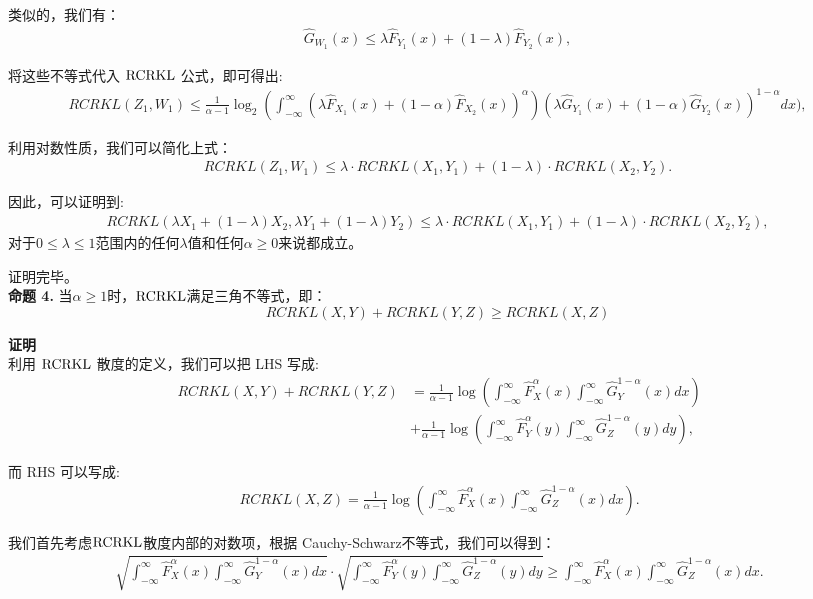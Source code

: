 类似的，我们有：
\begin{align*}
\hat G_{W_{1}}(x) \leq \lambda \hat F_{Y_{1}}(x)+ (1-\lambda) \hat F_{Y_{2}}(x),
\end{align*}

将这些不等式代入 $\rm{RCRKL}$ 公式，即可得出:
\begin{align*}
RCRKL(Z_{1},W_{1})\leq \frac{1}{\alpha -1}\log_{2}(\int_{-\infty}^{\infty}(\lambda \hat F_{X_{1}}(x)+(1-\alpha)\hat F_{X_{2}}(x))^{\alpha})(\lambda \hat G_{Y_{1}}(x)+(1-\alpha)\hat G_{Y_{2}}(x))^{1-\alpha}dx),
\end{align*}

利用对数性质，我们可以简化上式：
\begin{align*}
RCRKL(Z_{1},W_{1})\leq \lambda \cdot RCRKL(X_{1},Y_{1}) +(1-\lambda) \cdot RCRKL(X_{2},Y_{2}).
\end{align*}

因此，可以证明到:
\begin{align*}
RCRKL(\lambda X_{1}+(1-\lambda)X_{2}, \lambda Y_{1}+(1-\lambda)Y_{2})\leq \lambda \cdot RCRKL(X_{1},Y_{1}) +(1-\lambda) \cdot RCRKL(X_{2},Y_{2}),
\end{align*}
对于$0\leq \lambda \leq 1$范围内的任何$\lambda$值和任何$\alpha \geq 0$来说都成立。

证明完毕。\\

\textbf{命题 4.} 当$\alpha \ge 1$时，$\rm{RCRKL}$满足三角不等式，即：
$$RCRKL(X,Y) + RCRKL(Y,Z) \ge RCRKL(X,Z)$$

\textbf{证明}\\
利用 $\rm{RCRKL}$ 散度的定义，我们可以把 LHS 写成:
\begin{align*}\
RCRKL(X,Y) + RCRKL(Y,Z) &= \frac{1}{\alpha - 1}\log (\int_{-\infty}^{\infty} \hat F_{X}^{\alpha}(x) \int_{-\infty}^{\infty} \hat G_{Y}^{1-\alpha}(x)dx)\\
 &+ \frac{1}{\alpha - 1}\log (\int_{-\infty}^{\infty} \hat F_{Y}^{\alpha}(y) \int_{-\infty}^{\infty} \hat G_{Z}^{1-\alpha}(y)dy),
\end{align*}

而 RHS 可以写成:
\begin{align*}\
RCRKL(X,Z) = \frac{1}{\alpha - 1}\log (\int_{-\infty}^{\infty} \hat F_{X}^{\alpha}(x) \int_{-\infty}^{\infty} \hat G_{Z}^{1-\alpha}(x)dx).
\end{align*}

我们首先考虑$\rm{RCRKL}$散度内部的对数项，根据 Cauchy-Schwarz不等式，我们可以得到：
\begin{align*}\
\sqrt{\int_{-\infty}^{\infty} \hat F_{X}^{\alpha}(x) \int_{-\infty}^{\infty} \hat G_{Y}^{1-\alpha}(x)dx}\cdot \sqrt{\int_{-\infty}^{\infty} \hat F_{Y}^{\alpha}(y) \int_{-\infty}^{\infty} \hat G_{Z}^{1-\alpha}(y)dy} \ge  \int_{-\infty}^{\infty} \hat F_{X}^{\alpha}(x) \int_{-\infty}^{\infty} \hat G_{Z}^{1-\alpha}(x)dx.
\end{align*}


